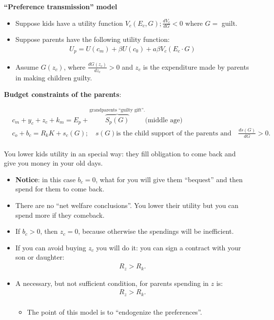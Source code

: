 \documentclass[14pt,notitlepage]{article}
\begin{document}
\textbf{``Preference transmission'' model}
\begin{itemize}
\item Suppose kids have a utility function $V_c (E_c, G); \frac{dV_c}{dG} < 0$ where $G =$ guilt.
\item Suppose parents have the following utility function:
\begin{align*}
U_p = U(c_m) + \beta U(c_0) + a \beta V_c(E_c \cdot G)
\end{align*}
\item Assume $G(z_c)$, where $\frac{dG(z_c)}{dz_c} > 0$ and $z_c$ is the expenditure made by parents in making children guilty.
\end{itemize}

\textbf{Budget constraints of the parents}:

\begin{align*}
&c_m + y_c + z_c + k_m = E_p + \overbrace{S_p(G)}^{\text{grandparents ``guilty gift''.}} \text{(middle age)} \\
&c_o + b_c = R_{k} K + s_c(G); \quad s(G) \text{is the child support of the parents and} \quad \frac{ds(G)}{dG} > 0. \\
\end{align*}

You lower kids utility in an special way: they fill obligation to come back and give you money in your old days.
\begin{itemize}
\item \textbf{Notice}: in this case $b_c = 0$, what for you will give them ``bequest'' and then spend for them to come back.
\item There are no ``net welfare conclusions''. You lower their utility but you can spend more if they comeback.
\item If $b_c > 0$, then $z_c = 0$, because otherwise the spendings will be inefficient.
\item If you can avoid buying $z_c$ you will do it: you can sign a contract with your son or daughter:
\begin{align*}
R_z > R_k.
\end{align*}
\item A necessary, but not sufficient condition, for parents spending in $z$ is:
\begin{align*}
R_z > R_k. \\
\end{align*}
    \begin{itemize}
    \item The point of this model is to ``endogenize the preferences''.
    \end{itemize}
\end{itemize}
\end{document}
